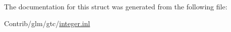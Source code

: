 The documentation for this struct was generated from the following file\+:\begin{DoxyCompactItemize}
\item 
Contrib/glm/gtc/\mbox{\hyperlink{gtc_2integer_8inl}{integer.\+inl}}\end{DoxyCompactItemize}

